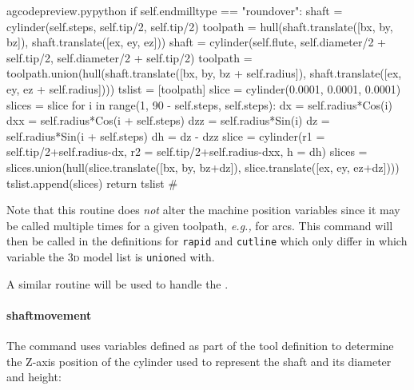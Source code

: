 \documentclass{ltxdoc}
\begin{document}
\lstset{firstnumber=\thegcpy}
\begin{writecode}{a}{gcodepreview.py}{python}
        if self.endmilltype == "roundover":
            shaft = cylinder(self.steps, self.tip/2, self.tip/2)
            toolpath = hull(shaft.translate([bx, by, bz]), shaft.translate([ex, ey, ez]))
            shaft = cylinder(self.flute, self.diameter/2 + self.tip/2, self.diameter/2 + self.tip/2)
            toolpath = toolpath.union(hull(shaft.translate([bx, by, bz + self.radius]), shaft.translate([ex, ey, ez + self.radius])))
            tslist = [toolpath]
            slice = cylinder(0.0001, 0.0001, 0.0001)
            slices = slice
            for i in range(1, 90 - self.steps, self.steps):
                dx = self.radius*Cos(i)
                dxx = self.radius*Cos(i + self.steps)
                dzz = self.radius*Sin(i)
                dz = self.radius*Sin(i + self.steps)
                dh = dz - dzz
                slice = cylinder(r1 = self.tip/2+self.radius-dx, r2 = self.tip/2+self.radius-dxx, h = dh)
                slices = slices.union(hull(slice.translate([bx, by, bz+dz]), slice.translate([ex, ey, ez+dz])))
                tslist.append(slices)
            return tslist
#
\end{writecode}
\addtocounter{gcpy}{19}

%
%
%

\noindent Note that this routine does \emph{not} alter the machine position variables since it may be called multiple times for a given toolpath, \emph{e.g.,} for arcs. This command will then be called in the definitions for \verb|rapid| and \verb|cutline| which only differ in which variable the \textsc{3d} model list is \verb|union|ed with.

A similar routine will be used to handle the .

\paragraph{shaftmovement} The  command uses variables defined as part of the tool definition to determine the Z-axis position of the cylinder used to represent the shaft and its diameter and height:
\end{document}
